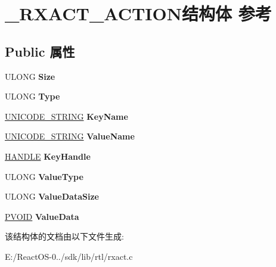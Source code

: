 \hypertarget{struct___r_x_a_c_t___a_c_t_i_o_n}{}\section{\+\_\+\+R\+X\+A\+C\+T\+\_\+\+A\+C\+T\+I\+O\+N结构体 参考}
\label{struct___r_x_a_c_t___a_c_t_i_o_n}
\subsection*{Public 属性}
\begin{DoxyCompactItemize}
\item 
\mbox{\label{struct___r_x_a_c_t___a_c_t_i_o_n_a5c20ff2be5753121953afa1570b825f3}} 
U\+L\+O\+NG {\bfseries Size}
\item 
\mbox{\label{struct___r_x_a_c_t___a_c_t_i_o_n_aacbc72e77da9183d9fa18167b9e01811}} 
U\+L\+O\+NG {\bfseries Type}
\item 
\mbox{\label{struct___r_x_a_c_t___a_c_t_i_o_n_aba3a1e7c2b4b066d76b22a5ca5cb0dc8}} 
\hyperlink{struct___u_n_i_c_o_d_e___s_t_r_i_n_g}{U\+N\+I\+C\+O\+D\+E\+\_\+\+S\+T\+R\+I\+NG} {\bfseries Key\+Name}
\item 
\mbox{\label{struct___r_x_a_c_t___a_c_t_i_o_n_a205ba976ef87f81cab2923b3bb497d3c}} 
\hyperlink{struct___u_n_i_c_o_d_e___s_t_r_i_n_g}{U\+N\+I\+C\+O\+D\+E\+\_\+\+S\+T\+R\+I\+NG} {\bfseries Value\+Name}
\item 
\mbox{\label{struct___r_x_a_c_t___a_c_t_i_o_n_a10723bc1af48c612780cac61bb65967f}} 
\hyperlink{interfacevoid}{H\+A\+N\+D\+LE} {\bfseries Key\+Handle}
\item 
\mbox{\label{struct___r_x_a_c_t___a_c_t_i_o_n_afd75ceb5c437e278bf5fd8ac41c54ec1}} 
U\+L\+O\+NG {\bfseries Value\+Type}
\item 
\mbox{\label{struct___r_x_a_c_t___a_c_t_i_o_n_a86b0efd5c795dbd51c6856f618f21172}} 
U\+L\+O\+NG {\bfseries Value\+Data\+Size}
\item 
\mbox{\label{struct___r_x_a_c_t___a_c_t_i_o_n_a99f1fb0b21d7dfe69a7b59a76ff0d779}} 
\hyperlink{interfacevoid}{P\+V\+O\+ID} {\bfseries Value\+Data}
\end{DoxyCompactItemize}


该结构体的文档由以下文件生成\+:\begin{DoxyCompactItemize}
\item 
E\+:/\+React\+O\+S-\/0../sdk/lib/rtl/rxact.\+c\end{DoxyCompactItemize}
